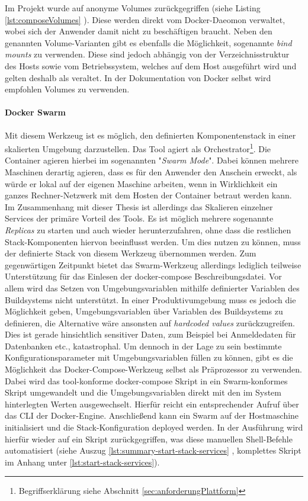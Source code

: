 Im Projekt wurde auf anonyme Volumes zurückgegriffen (siehe Listing \ref{lst:composeVolumes} ). Diese werden direkt vom Docker-Daeomon verwaltet, wobei sich der Anwender damit nicht zu beschäftigen braucht. Neben den genannten Volume-Varianten gibt es ebenfalls die Möglichkeit, sogenannte \emph{bind mounts} zu verwenden. Diese sind jedoch abhängig von der Verzeichnisstruktur des Hosts sowie vom Betriebssystem, welches auf dem Host ausgeführt wird und gelten deshalb als veraltet. In der Dokumentation von Docker selbst wird empfohlen Volumes zu verwenden.

\paragraph{Docker Swarm}
Mit diesem Werkzeug ist es möglich, den definierten Komponentenstack in einer skalierten Umgebung darzustellen. Das Tool agiert als Orchestrator\footnote{Begriffserklärung siehe Abschnitt \ref{sec:anforderungPlattform} }. Die Container agieren hierbei im sogenannten "\emph{Swarm Mode}". Dabei können mehrere Maschinen derartig agieren, dass es für den Anwender den Anschein erweckt, als würde er lokal auf der eigenen Maschine arbeiten, wenn in Wirklichkeit ein ganzes Rechner-Netzwerk mit dem Hosten der Container betraut werden kann. Im Zusammenhang mit dieser Thesis ist allerdings das Skalieren einzelner Services der primäre Vorteil des Tools. Es ist möglich mehrere sogenannte \emph{Replicas} zu starten und auch wieder herunterzufahren, ohne dass die restlichen Stack-Komponenten hiervon beeinflusst werden. Um dies nutzen zu können, muss der definierte Stack von diesem Werkzeug übernommen werden. Zum gegenwärtigen Zeitpunkt bietet das Swarm-Werkzeug allerdings lediglich teilweise Unterstützung für das Einlesen der docker-compose Beschreibungsdatei. Vor allem wird das Setzen von Umgebungsvariablen mithilfe definierter Variablen des Buildsystems nicht unterstützt. In einer Produktivumgebung muss es jedoch die Möglichkeit geben, Umgebungsvariablen über Variablen des Buildsystems zu definieren, die Alternative wäre ansonsten auf \emph{hardcoded values} zurückzugreifen. Dies ist gerade hinsichtlich sensitiver Daten, zum Beispiel bei Anmeldedaten für Datenbanken etc., katastrophal. Um dennoch in der Lage zu sein bestimmte Konfigurationsparameter mit Umgebungsvariablen füllen zu können, gibt es die Möglichkeit das Docker-Compose-Werkzeug selbst als Präprozessor zu verwenden. Dabei wird das tool-konforme docker-compose Skript in ein Swarm-konformes Skript umgewandelt und die Umgebungsvariablen direkt mit den im System hinterlegten Werten ausgewechselt. Hierfür reicht ein entsprechender Aufruf über das CLI der Docker-Engine. Anschließend kann ein Swarm auf der Hostmaschine initialisiert und die Stack-Konfiguration deployed werden. In der Ausführung wird hierfür wieder auf ein Skript zurückgegriffen, was diese manuellen Shell-Befehle automatisiert (siehe Auszug \ref{lst:summary-start-stack-services} , komplettes Skript im Anhang unter \ref{lst:start-stack-services}).

